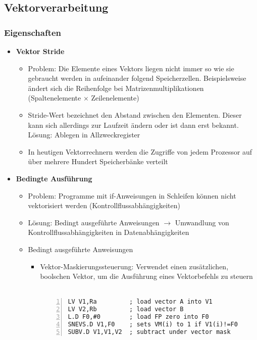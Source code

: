 \subsection{Vektorverarbeitung}

\subsubsection{Eigenschaften}
\begin{itemize}
	\item \textbf{Vektor Stride}
	\begin{itemize}
		\item Problem: Die Elemente eines Vektors liegen nicht immer so wie sie gebraucht werden in aufeinander folgend Speicherzellen. Beispielsweise ändert sich die Reihenfolge bei Matrizenmultiplikationen (Spaltenelemente \(\times\) Zeilenelemente)
		\item Stride-Wert bezeichnet den Abstand zwischen den Elementen. Dieser kann sich allerdings zur Laufzeit ändern oder ist dann erst bekannt. Lösung: Ablegen in Allzweckregister
		\item In heutigen Vektorrechnern werden die Zugriffe von jedem Prozessor auf über mehrere Hundert Speicherbänke verteilt 
	\end{itemize}
	\item \textbf{Bedingte Ausführung}
	\begin{itemize}
		\item Problem: Programme mit if-Anweisungen in Schleifen können nicht vektorisiert werden (Kontrollflussabhängigkeiten)
		\item Lösung: Bedingt ausgeführte Anweisungen \(\rightarrow\) Umwandlung von Kontrollflussabhängigkeiten in Datenabhängigkeiten
		\item Bedingt ausgeführte Anweisungen
		\begin{itemize}
			\item Vektor-Maskierungssteuerung: Verwendet einen zusätzlichen, boolschen Vektor, um die Ausführung eines Vektorbefehls zu steuern\\\\
				\begin{minipage}{\linewidth}
				\begin{lstlisting}[frame=single,numbers=left,mathescape,language={[mips]Assembler}]
LV V1,Ra         ; load vector A into V1
LV V2,Rb         ; load vector B
L.D F0,#0        ; load FP zero into F0
SNEVS.D V1,F0    ; sets VM(i) to 1 if V1(i)!=F0
SUBV.D V1,V1,V2  ; subtract under vector mask

\end{lstlisting}
\end{minipage}
\end{itemize}
\end{itemize}
\end{itemize}
